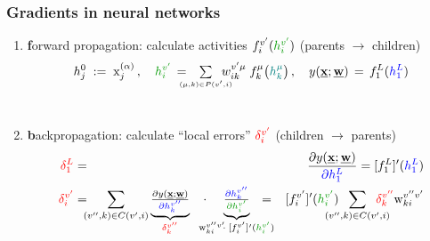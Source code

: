 \begin{frame} \frametitle{Gradients in neural networks}
	
	\vspace{11mm}
	\begin{enumerate}
		\item {\textbf forward propagation}: calculate activities 
				$f_i^{v'}({\color{darkgreen}h_i^{v'}})$
				{\small(parents $\rightarrow$ children)}
				$$	
					{
					h_j^0
					} 
						\;:=\; \mathrm{x}_j^{(\alpha)} \,, 
					\quad 
					{\color{darkgreen}h_i^{v'}}
		   			\,= \kern-2ex\smallsum{(\mu,k) \in P(v',i)}{} \kern-2ex
	   			w_{ik}^{v'\mu}\;  f_k^\mu\big( {\color{teal} h_k^\mu} \big) \,,
					\quad
					y(\vec{x}; \vec{w})\,=\, f_1^L({\color{blue}h_1^L})
				$$\\[-2mm]
		\pause
		\item {\textbf backpropagation}: calculate ``local errors'' 
				$\color{red}\delta_i^{v'}$
				{\small(children $\rightarrow$ parents)}
				\vspace{-1mm}
				\begin{eqnarray*} 
				{\color{red} \delta_1^L}
				&=& \frac{\partial y(\vec{x}; \vec{w})} {{\color{blue}\partial h_1^{L}}}
					= [f_1^{L}]'({\color{blue} h_1^{L}})
							\\
					{\color{red}\delta_i^{v'}}  
						&=&  \kern-3ex\sum\limits_{(v'', k) \in C(v', i)}
						\underbrace{
							\smallfrac{\partial y(\vec{x}; \vec{w})}
								{{\color{blue}\partial  h_k^{v''}}}
							}_{{\color{red}\delta_k^{v''}}} 
						\;\kern1.5ex\cdot \kern-2.5ex\;
						\underbrace{\smallfrac
								{{\color{blue}\partial h_k^{v''}} }
								{{\color{darkgreen}\partial h_i^{v'}}}
							}_{\mathrm{w}_{ki}^{v''v'} \kern-.5ex\cdot\kern.5ex
								[f_i^{v'}]'({\color{darkgreen}h_i^{v'}}) } %
					\kern-3ex=\;\;\; %
							[f_i^{v'}]'({\color{darkgreen}h_i^{v'}}) 
							\kern-3ex\sum_{(v'', k) \in C(v', i)}\kern-3ex
							{\color{red}\delta_k^{v''}} 
							\mathrm{w}_{ki}^{v'' v'} 

\end{eqnarray*}
\end{enumerate}
\end{frame}
